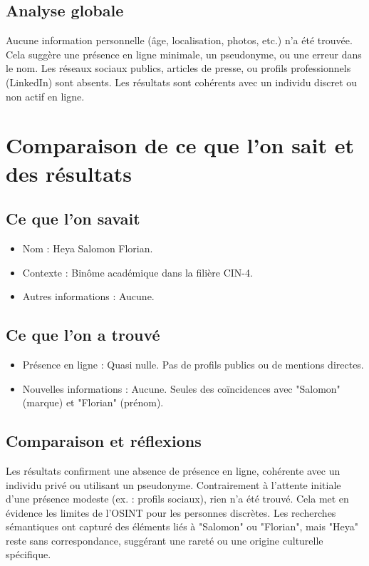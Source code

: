 \documentclass[12pt,a4paper]{article}
\begin{document}
\subsection{Analyse globale}
Aucune information personnelle (âge, localisation, photos, etc.) n'a été trouvée. Cela suggère une présence en ligne minimale, un pseudonyme, ou une erreur dans le nom. Les réseaux sociaux publics, articles de presse, ou profils professionnels (LinkedIn) sont absents. Les résultats sont cohérents avec un individu discret ou non actif en ligne.

\section{Comparaison de ce que l'on sait et des résultats}
\subsection{Ce que l'on savait}
\begin{itemize}
    \item Nom : Heya Salomon Florian.
    \item Contexte : Binôme académique dans la filière CIN-4.
    \item Autres informations : Aucune.
\end{itemize}

\subsection{Ce que l'on a trouvé}
\begin{itemize}
    \item Présence en ligne : Quasi nulle. Pas de profils publics ou de mentions directes.
    \item Nouvelles informations : Aucune. Seules des coïncidences avec "Salomon" (marque) et "Florian" (prénom).
\end{itemize}

\subsection{Comparaison et réflexions}
Les résultats confirment une absence de présence en ligne, cohérente avec un individu privé ou utilisant un pseudonyme. Contrairement à l'attente initiale d'une présence modeste (ex. : profils sociaux), rien n'a été trouvé. Cela met en évidence les limites de l'OSINT pour les personnes discrètes. Les recherches sémantiques ont capturé des éléments liés à "Salomon" ou "Florian", mais "Heya" reste sans correspondance, suggérant une rareté ou une origine culturelle spécifique.
\end{document}

